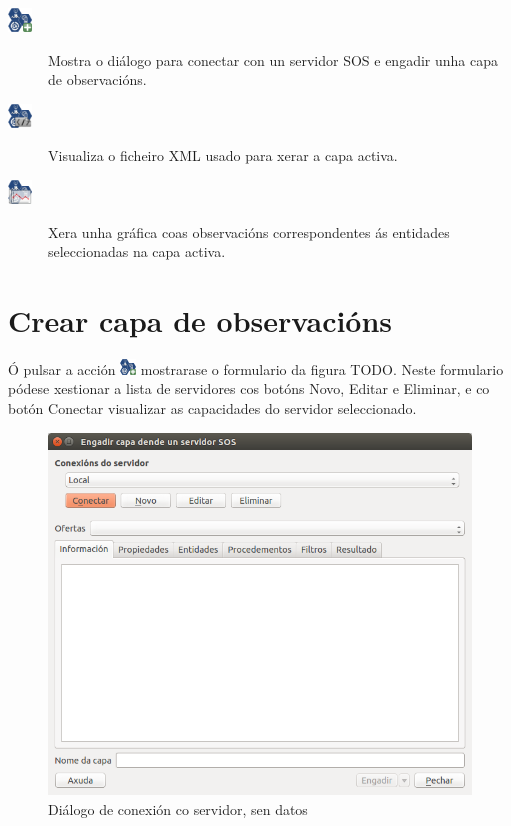 \begin{description}
\item [{\includegraphics[width=24px]{images/manual/icon_add.png}}] Mostra o diálogo para conectar con un servidor SOS e engadir unha capa de observacións. 
\item [{\includegraphics[width=24px]{images/manual/icon_xml.png}}] Visualiza o ficheiro XML usado para xerar a capa activa. 
\item [{\includegraphics[width=24px]{images/manual/icon_plot.png}}] Xera unha gráfica coas observacións correspondentes ás entidades seleccionadas na capa activa.
\end{description}

\section{Crear capa de observacións}
Ó pulsar a acción \includegraphics[width=16px]{images/manual/icon_add.png} mostrarase o formulario da figura TODO. Neste formulario pódese xestionar a lista de servidores cos botóns Novo, Editar e Eliminar, e co botón Conectar visualizar as capacidades do servidor seleccionado.
\begin{figure}[hbtp]
\centering
\includegraphics[width=\textwidth]{images/manual/tabInfo-limpia.png}
\caption{Diálogo de conexión co servidor, sen datos}
\label{fig:tabInfo-limpia}
\end{figure}

